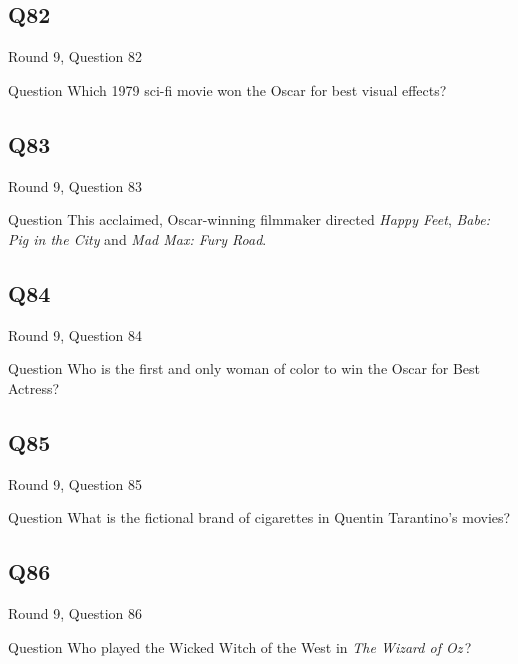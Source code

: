 \documentclass[11pt]{beamer}
\begin{document}
\subsection*{Q82}
\begin{frame}[t]{Round 9, Question 82}
\vspace{2em}
\begin{block}{Question}
Which 1979 sci-fi movie won the Oscar for best visual effects?
\end{block}
\end{frame}
    

\subsection*{Q83}
\begin{frame}[t]{Round 9, Question 83}
\vspace{2em}
\begin{block}{Question}
This acclaimed, Oscar-winning filmmaker directed \emph{Happy Feet}, \emph{Babe: Pig in the City} and \emph{Mad Max: Fury Road}.
\end{block}
\end{frame}
    

\subsection*{Q84}
\begin{frame}[t]{Round 9, Question 84}
\vspace{2em}
\begin{block}{Question}
Who is the first and only woman of color to win the Oscar for Best Actress?
\end{block}
\end{frame}
    

\subsection*{Q85}
\begin{frame}[t]{Round 9, Question 85}
\vspace{2em}
\begin{block}{Question}
What is the fictional brand of cigarettes in Quentin Tarantino's movies?
\end{block}
\end{frame}
    

\subsection*{Q86}
\begin{frame}[t]{Round 9, Question 86}
\vspace{2em}
\begin{block}{Question}
Who played the Wicked Witch of the West in \emph{The Wizard of Oz}\,?
\end{block}
\end{frame}
    
\end{document}
